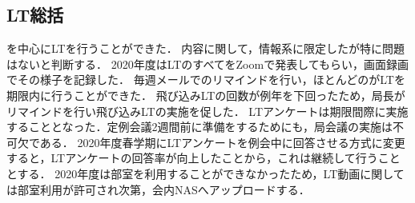 \subsection*{LT総括}


\firstGrade{}を中心にLTを行うことができた．
内容に関して，情報系に限定したが特に問題はないと判断する．
2020年度はLTのすべてをZoomで発表してもらい，画面録画でその様子を記録した．
毎週メールでのリマインドを行い，ほとんどの\firstGrade{}がLTを期限内に行うことができた．
飛び込みLTの回数が例年を下回ったため，局長がリマインドを行い飛び込みLTの実施を促した．
LTアンケートは期限間際に実施することとなった．定例会議2週間前に準備をするためにも，局会議の実施は不可欠である．
2020年度春学期にLTアンケートを例会中に回答させる方式に変更すると，LTアンケートの回答率が向上したことから，これは継続して行うこととする．
2020年度は部室を利用することができなかったため，LT動画に関しては部室利用が許可され次第，会内NASへアップロードする．